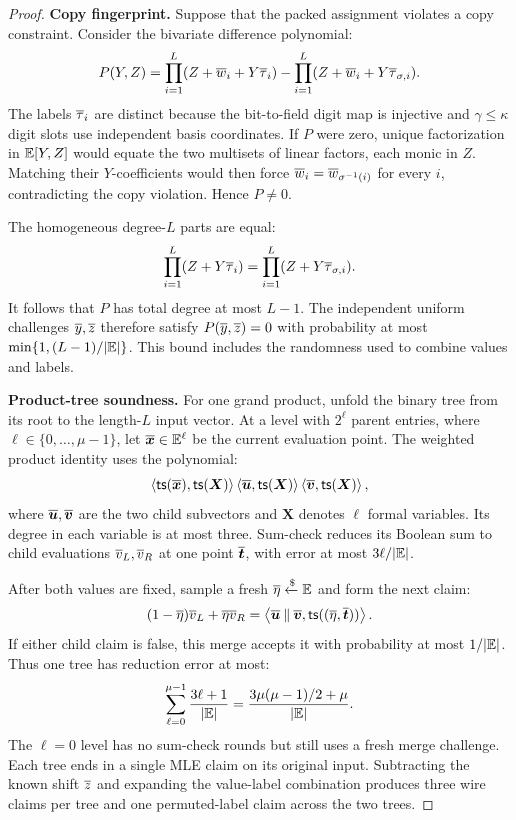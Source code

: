 \begin{proof}
\smallskip\noindent\textbf{Copy fingerprint.}
Suppose that the packed assignment violates a copy constraint.
Consider the bivariate difference polynomial:
\[
    P(Y,Z)=
       \prod_{i=1}^{L}(Z+\overline{w}_i+Y\overline{\tau}_i)
       -\prod_{i=1}^{L}(Z+\overline{w}_i+Y\overline{\tau}_{\sigma,i}).
\]
The labels \(\overline{\tau}_i\) are distinct because the bit-to-field
digit map is injective and \(\gamma\leq\kappa\) digit slots use
independent basis coordinates.
If \(P\) were zero, unique factorization in
\(\mathbb{E}[Y,Z]\) would equate the two multisets of
linear factors, each monic in \(Z\).
Matching their \(Y\)-coefficients would then force
\(\overline{w}_i=\overline{w}_{\sigma^{-1}(i)}\) for every \(i\),
contradicting the copy violation. Hence \(P\ne0\).

The homogeneous degree-\(L\) parts are equal:
\[
    \prod_{i=1}^{L}(Z+Y\overline{\tau}_i)
       =\prod_{i=1}^{L}(Z+Y\overline{\tau}_{\sigma,i}).
\]
It follows that \(P\) has total degree at most \(L-1\).
The independent uniform challenges \(\overline{y},\overline{z}\) therefore
satisfy \(P(\overline{y},\overline{z})=0\) with probability at most
\(\min\{1,(L-1)/|\mathbb{E}|\}\).
This bound includes the randomness used to combine values and labels.

\smallskip\noindent\textbf{Product-tree soundness.}
For one grand product, unfold the binary tree from its root
to the length-\(L\) input vector.
At a level with \(2^\ell\) parent entries, where
\(\ell\in\{0,\ldots,\mu-1\}\), let
\(\overline{\bm x}\in\mathbb{E}^\ell\) be the current
evaluation point.
The weighted product identity uses the polynomial:
\[
    \left\langle
       {\sf ts}(\overline{\bm x}),{\sf ts}(\bm X)
    \right\rangle
    \left\langle\overline{\bm u},{\sf ts}(\bm X)\right\rangle
    \left\langle\overline{\bm v},{\sf ts}(\bm X)\right\rangle,
\]
where \(\overline{\bm u},\overline{\bm v}\) are the two child subvectors
and \(\bm X\) denotes \(\ell\) formal variables.
Its degree in each variable is at most three.
Sum-check reduces its Boolean sum to child evaluations
\(\overline{v}_L,\overline{v}_R\) at one point \(\overline{\bm t}\), with
error at most \(3\ell/|\mathbb{E}|\).

After both values are fixed, sample a fresh
\(\overline{\eta}\mathrel{\xleftarrow{\$}}\mathbb{E}\) and form the next claim:
\[
    (1-\overline{\eta})\overline{v}_L+\overline{\eta}\overline{v}_R
       =
    \left\langle
       \overline{\bm u}\mathbin{\|}\overline{\bm v},
       {\sf ts}((\overline{\eta},\overline{\bm t}))
    \right\rangle.
\]
If either child claim is false, this merge accepts it
with probability at most \(1/|\mathbb{E}|\).
Thus one tree has reduction error at most:
\[
    \sum_{\ell=0}^{\mu-1}
       \frac{3\ell+1}{|\mathbb{E}|}
       =
    \frac{3\mu(\mu-1)/2+\mu}{|\mathbb{E}|}.
\]
The \(\ell=0\) level has no sum-check rounds but still uses
a fresh merge challenge.
Each tree ends in a single MLE claim on its original input.
Subtracting the known shift \(\overline{z}\) and expanding the
value-label combination produces three wire claims per tree
and one permuted-label claim across the two trees.


\end{proof}
